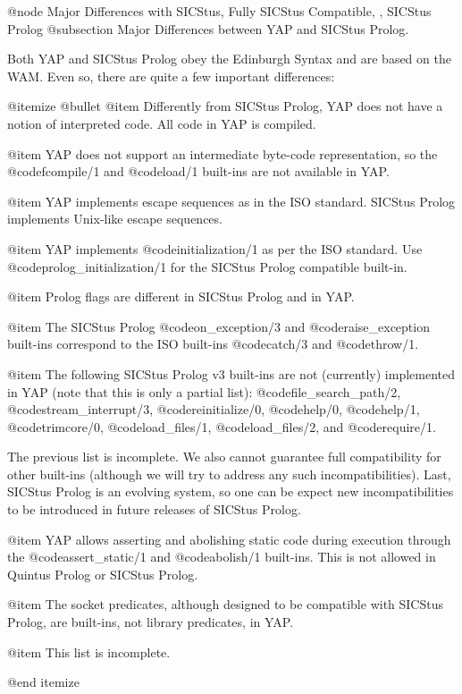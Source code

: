 {{{{{{{{@node Major Differences with SICStus, Fully SICStus Compatible, , SICStus Prolog
@subsection Major Differences between YAP and SICStus Prolog.

Both YAP and SICStus Prolog obey the Edinburgh Syntax and are based on
the WAM. Even so, there are quite a few important differences:

@itemize @bullet
@item Differently from SICStus Prolog, YAP does not have a
notion of interpreted code. All code in YAP is compiled.

@item YAP does not support an intermediate byte-code
representation, so the @code{fcompile/1} and @code{load/1} built-ins are
not available in YAP.

@item YAP implements escape sequences as in the ISO standard. SICStus
Prolog implements Unix-like escape sequences.

@item YAP implements @code{initialization/1} as per the ISO
standard. Use @code{prolog_initialization/1} for the SICStus Prolog
compatible built-in.

@item Prolog flags are different in SICStus Prolog and in YAP.

@item The SICStus Prolog @code{on_exception/3} and
@code{raise_exception} built-ins correspond to the ISO built-ins
@code{catch/3} and @code{throw/1}.

@item The following SICStus Prolog v3 built-ins are not (currently)
implemented in YAP (note that this is only a partial list):
@code{file_search_path/2},
@code{stream_interrupt/3}, @code{reinitialize/0}, @code{help/0},
@code{help/1}, @code{trimcore/0}, @code{load_files/1},
@code{load_files/2}, and @code{require/1}.

      The previous list is incomplete. We also cannot guarantee full
compatibility for other built-ins (although we will try to address any
such incompatibilities). Last, SICStus Prolog is an evolving system, so
one can be expect new incompatibilities to be introduced in future
releases of SICStus Prolog.

@item YAP allows asserting and abolishing static code during
execution through the @code{assert_static/1} and @code{abolish/1}
built-ins. This is not allowed in Quintus Prolog or SICStus Prolog.

@item The socket predicates, although designed to be compatible with
SICStus Prolog, are built-ins, not library predicates, in YAP.

@item This list is incomplete.

@end itemize

}}}}}}}}
